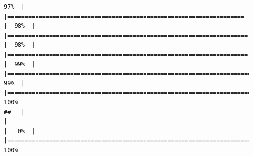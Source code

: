 \documentclass[
  english,
  man,a4paper,mask,floatsintext]{apa6}
\begin{document}
\begin{verbatim}
97%  |                                                                              |====================================================================  |  98%  |                                                                              |===================================================================== |  98%  |                                                                              |===================================================================== |  99%  |                                                                              |======================================================================|  99%  |                                                                              |======================================================================| 100%
##   |                                                                              |                                                                      |   0%  |                                                                              |======================================================================| 100%

\end{verbatim}
\end{document}
